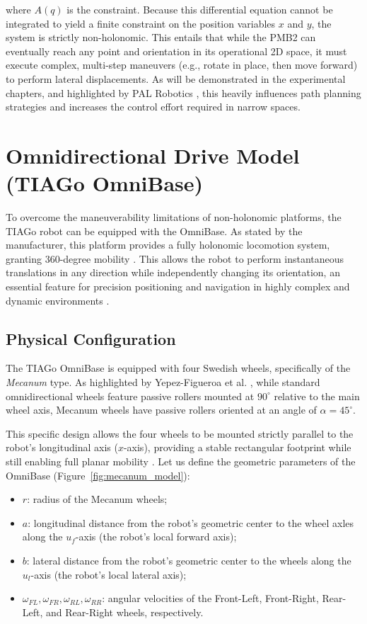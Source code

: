 where $A(q)$ is the constraint. Because this differential equation cannot be integrated to yield a finite constraint on the position variables $x$ and $y$, the system is strictly non-holonomic. This entails that while the PMB2 can eventually reach any point and orientation in its operational 2D space, it must execute complex, multi-step maneuvers (e.g., rotate in place, then move forward) to perform lateral displacements. As will be demonstrated in the experimental chapters, and highlighted by PAL Robotics \cite{pal_blog_omni_diff}, this heavily influences path planning strategies and increases the control effort required in narrow spaces.


\section{Omnidirectional Drive Model (TIAGo OmniBase)}
\label{sec:omni_model}

To overcome the maneuverability limitations of non-holonomic platforms, the TIAGo robot can be equipped with the OmniBase. As stated by the manufacturer, this platform provides a fully holonomic locomotion system, granting 360-degree mobility \cite{pal_tiago_omnibase}. This allows the robot to perform instantaneous translations in any direction while independently changing its orientation, an essential feature for precision positioning and navigation in highly complex and dynamic environments \cite{pal_blog_omni_diff}.

\subsection{Physical Configuration}

The TIAGo OmniBase is equipped with four Swedish wheels, specifically of the \emph{Mecanum} type. As highlighted by Yepez-Figueroa et al. \cite{yepez-figueroa_design_2025}, while standard omnidirectional wheels feature passive rollers mounted at $90^\circ$ relative to the main wheel axis, Mecanum wheels have passive rollers oriented at an angle of $\alpha = 45^\circ$. 

This specific design allows the four wheels to be mounted strictly parallel to the robot's longitudinal axis ($x$-axis), providing a stable rectangular footprint while still enabling full planar mobility \cite{yepez-figueroa_design_2025}. Let us define the geometric parameters of the OmniBase (Figure~\ref{fig:mecanum_model}):
\begin{itemize}
    \item $r$: radius of the Mecanum wheels;
    \item $a$: longitudinal distance from the robot's geometric center to the wheel axles along the $u_f$-axis (the robot's local forward axis);
    \item $b$: lateral distance from the robot's geometric center to the wheels along the $u_l$-axis (the robot's local lateral axis);
    \item $\omega_{FL}, \omega_{FR}, \omega_{RL}, \omega_{RR}$: angular velocities of the Front-Left, Front-Right, Rear-Left, and Rear-Right wheels, respectively.
\end{itemize}

